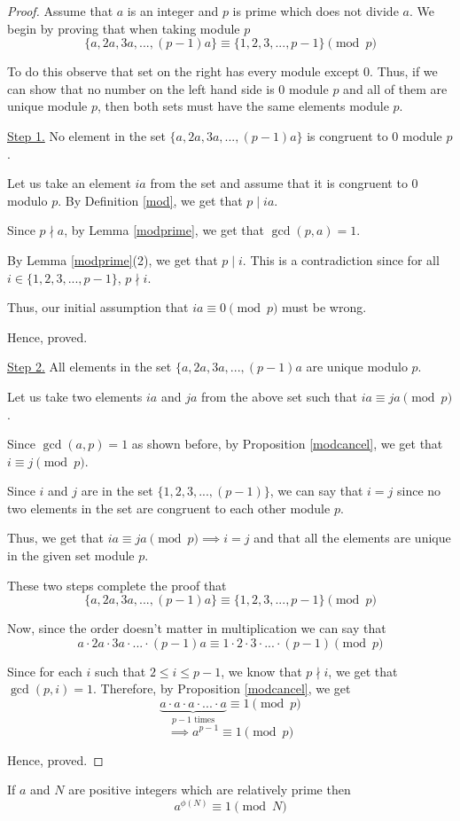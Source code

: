 \begin{proof}
	Assume that $a$ is an integer and $p$ is prime which does not divide $a$. We begin by proving that when taking module $p$
	$$\{a, 2a, 3a, ..., (p-1)a\} \equiv \{1, 2, 3, ..., p-1\} \pmod p$$

	To do this observe that set on the right has every module except $0$. Thus, if we can show that no number on the left hand side is $0$ module $p$ and all of them are unique module $p$, then both sets must have the same elements module $p$.

	\underline{Step 1.} No element in the set $\{a, 2a, 3a, ..., (p-1)a\}$ is congruent to $0$ module $p$.

	Let us take an element $ia$ from the set and assume that it is congruent to $0$ modulo $p$. By Definition \ref{mod}, we get that $p \mid ia$.

	Since $p \nmid a$, by Lemma \ref{modprime}, we get that $\gcd(p, a) = 1$.

	By Lemma \ref{modprime}(2), we get that $p \mid i$. This is a contradiction since for all $i \in \{1, 2, 3, ..., p-1\}$, $p \nmid i$.

	Thus, our initial assumption that $ia \equiv 0 \pmod p$ must be wrong.

	Hence, proved.

	\bigbreak

	\underline{Step 2.} All elements in the set $\{a, 2a, 3a, ..., (p-1)a$ are unique modulo $p$.

	Let us take two elements $ia$ and $ja$ from the above set such that $ia \equiv ja \pmod p$.

	Since $\gcd(a, p) = 1$ as shown before, by Proposition \ref{modcancel}, we get that $i \equiv j \pmod p$.

	Since $i$ and $j$ are in the set $\{1, 2, 3, ..., (p-1)\}$, we can say that $i = j$ since no two elements in the set are congruent to each other module $p$.

	Thus, we get that $ia \equiv ja \pmod p \implies i = j$ and that all the elements are unique in the given set module $p$.


	These two steps complete the proof that
	$$\{a, 2a, 3a, ..., (p-1)a\} \equiv \{1, 2, 3, ..., p-1\} \pmod p$$

	Now, since the order doesn't matter in multiplication we can say that
	$$a \cdot 2a \cdot 3a \cdot ... \cdot (p-1)a \equiv 1 \cdot 2 \cdot 3 \cdot ... \cdot (p-1) \pmod p$$

	Since for each $i$ such that $2 \leq i \leq p-1$, we know that $p \nmid i$, we get that $\gcd(p, i) = 1$. Therefore, by Proposition \ref{modcancel}, we get
	$$\underbrace{a \cdot a \cdot a \cdot ... \cdot a}_{p-1 \text{ times}} \equiv 1 \pmod p$$
	$$ \implies a^{p-1} \equiv 1 \pmod p$$

	Hence, proved.
\end{proof}

\begin{theorem}
	If $a$ and $N$ are positive integers which are relatively prime then
	$$a^{\phi(N)} \equiv 1 \pmod{N}$$
\end{theorem}
